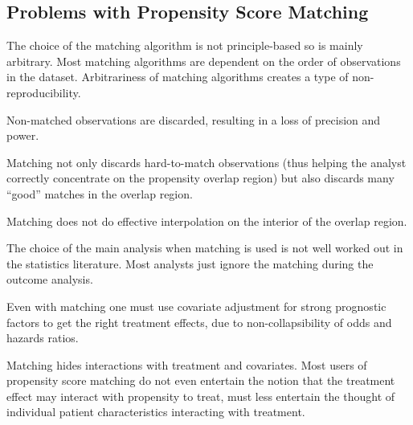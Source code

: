 \subsection{Problems with Propensity Score Matching}\label{sec:psmatch}
\bi
\item The choice of the matching algorithm is not principle-based so
  is mainly arbitrary.  Most matching algorithms are dependent on the
  order of observations in the dataset.  Arbitrariness of matching
  algorithms creates a type of non-reproducibility. 
\item Non-matched observations are discarded, resulting in a loss of
  precision and power.
\item Matching not only discards hard-to-match observations (thus
  helping the analyst correctly concentrate on the propensity overlap
  region) but also discards many ``good'' matches in the overlap
  region.
\item Matching does not do effective interpolation on the interior of
  the overlap region.
\item The choice of the main analysis when matching is used is not
  well worked out in the statistics literature.  Most analysts just
  ignore the matching during the outcome analysis.
\item Even with matching one must use covariate adjustment for strong
  prognostic factors to get the right treatment effects, due to
  non-collapsibility of odds and hazards ratios.
\item Matching hides interactions with treatment and covariates.
\ei
Most users of propensity score matching do not even entertain the
notion that the treatment effect may interact with propensity to
treat, must less entertain the thought of individual patient
characteristics interacting with treatment.

